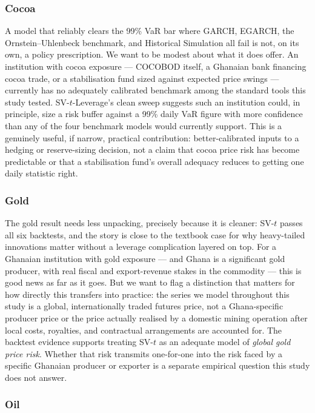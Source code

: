 \documentclass[preprint,12pt,authoryear]{elsarticle}
\begin{document}
\subsubsection{Cocoa}

A model that reliably clears the 99\% VaR bar where GARCH, EGARCH, the Ornstein--Uhlenbeck benchmark, and Historical Simulation all fail is not, on its own, a policy prescription. We want to be modest about what it does offer. An institution with cocoa exposure --- COCOBOD itself, a Ghanaian bank financing cocoa trade, or a stabilisation fund sized against expected price swings --- currently has no adequately calibrated benchmark among the standard tools this study tested. SV-$t$-Leverage's clean sweep suggests such an institution could, in principle, size a risk buffer against a 99\% daily VaR figure with more confidence than any of the four benchmark models would currently support. This is a genuinely useful, if narrow, practical contribution: better-calibrated inputs to a hedging or reserve-sizing decision, not a claim that cocoa price risk has become predictable or that a stabilisation fund's overall adequacy reduces to getting one daily statistic right.

\subsubsection{Gold}

The gold result needs less unpacking, precisely because it is cleaner: SV-$t$ passes all six backtests, and the story is close to the textbook case for why heavy-tailed innovations matter without a leverage complication layered on top. For a Ghanaian institution with gold exposure --- and Ghana is a significant gold producer, with real fiscal and export-revenue stakes in the commodity --- this is good news as far as it goes. But we want to flag a distinction that matters for how directly this transfers into practice: the series we model throughout this study is a global, internationally traded futures price, not a Ghana-specific producer price or the price actually realised by a domestic mining operation after local costs, royalties, and contractual arrangements are accounted for. The backtest evidence supports treating SV-$t$ as an adequate model of \emph{global gold price risk}. Whether that risk transmits one-for-one into the risk faced by a specific Ghanaian producer or exporter is a separate empirical question this study does not answer.

\subsubsection{Oil}
\end{document}
